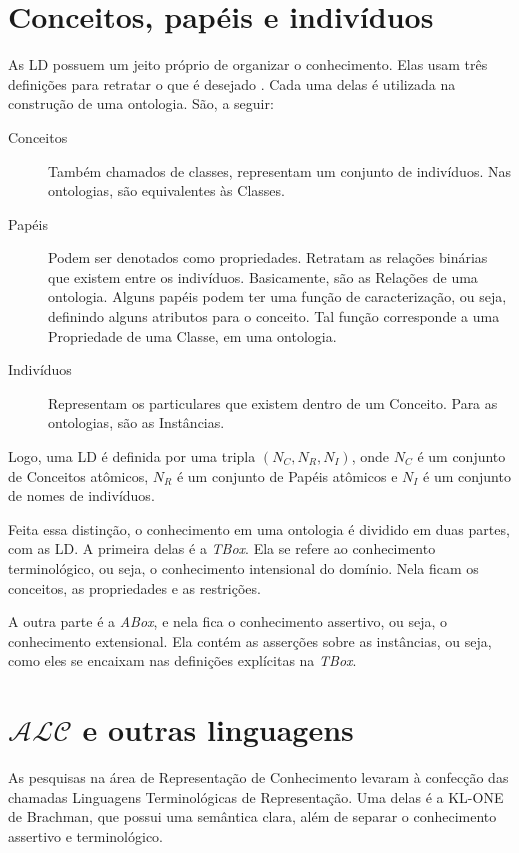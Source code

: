 \section{Conceitos, papéis e indivíduos}

As LD possuem um jeito próprio de organizar o conhecimento. Elas usam três definições para retratar o que é desejado \cite{logicaMatos}. Cada uma delas é utilizada na construção de uma ontologia. São, a seguir:

\begin{description}
	\item[Conceitos] Também chamados de classes, representam um conjunto de indivíduos. Nas ontologias, são equivalentes às Classes.
	\item[Papéis] Podem ser denotados como propriedades. Retratam as relações binárias que existem entre os indivíduos. Basicamente, são as Relações de uma ontologia. Alguns papéis podem ter uma função de caracterização, ou seja, definindo alguns atributos para o conceito. Tal função corresponde a uma Propriedade de uma Classe, em uma ontologia.
	\item[Indivíduos] Representam os particulares que existem dentro de um Conceito. Para as ontologias, são as Instâncias.
\end{description}

Logo, uma LD é definida por uma tripla $ (N_C, N_R, N_I) $, onde $ N_C $ é um conjunto de Conceitos atômicos, $ N_R $ é um conjunto de Papéis atômicos e $ N_I $ é um conjunto de nomes de indivíduos.

Feita essa distinção, o conhecimento em uma ontologia é dividido em duas partes, com as LD. A primeira delas é a \textit{TBox}. Ela se refere ao conhecimento terminológico, ou seja, o conhecimento intensional do domínio. Nela ficam os conceitos, as propriedades e as restrições.

A outra parte é a \textit{ABox}, e nela fica o conhecimento assertivo, ou seja, o conhecimento extensional. Ela contém as asserções sobre as instâncias, ou seja, como eles se encaixam nas definições explícitas na \textit{TBox}.

\section{$\mathcal{ALC}$ e outras linguagens}

As pesquisas na área de Representação de Conhecimento levaram à confecção das chamadas Linguagens Terminológicas de Representação. Uma delas é a KL-ONE de Brachman, que possui uma semântica clara, além de separar o conhecimento assertivo e terminológico. %

